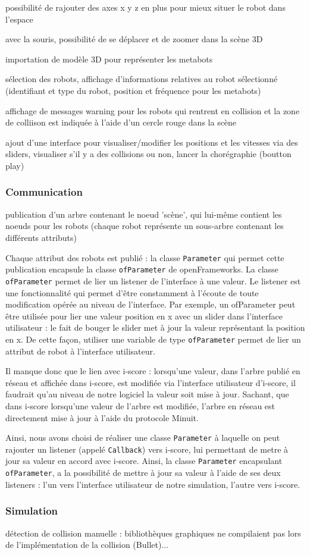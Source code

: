 possibilité de rajouter des axes x y z en plus pour mieux situer le robot dans l'espace

avec la souris, possibilité de se déplacer et de zoomer dans la scène 3D 

importation de modèle 3D pour représenter les metabots

sélection des robots, affichage d'informations relatives au robot sélectionné (identifiant et type du robot, position et fréquence pour les metabots)

affichage de messages warning pour les robots qui rentrent en collision et la zone de colliison est indiquée à l'aide d'un cercle rouge dans la scène

ajout d'une interface pour visualiser/modifier les positions et les vitesses via des sliders, visualiser s'il y a des collisions ou non, lancer la chorégraphie (boutton play)

\subsubsection{Communication}

publication d'un arbre contenant le noeud 'scène', qui lui-même contient les noeuds pour les robots (chaque robot représente un sous-arbre contenant les différents attributs)

Chaque attribut des robots est publié : la classe \verb|Parameter| qui permet cette publication encapsule la classe \verb|ofParameter| de openFrameworks. La classe \verb|ofParameter| permet de lier un listener de l'interface à une valeur. Le listener est une fonctionnalité qui permet d'être constamment à l'écoute de toute modification opérée au niveau de l'interface. Par exemple, un ofParameter peut être utilisée pour lier une valeur position en x avec un slider dans l'interface utilisateur : le fait de bouger le slider met à jour la valeur représentant la position en x. De cette façon, utiliser une variable de type \verb|ofParameter| permet de lier un attribut de robot à l'interface utilisateur. 

Il manque donc que le lien avec i-score : lorsqu'une valeur, dans l'arbre publié en réseau et affichée dans i-score, est modifiée via l'interface utilisateur d'i-score, il faudrait qu'au niveau de notre logiciel la valeur soit mise à jour. Sachant, que dans i-score lorsqu'une valeur de l'arbre est modifiée, l'arbre en réseau est directement mise à jour à l'aide du protocole Minuit.

Ainsi, nous avons choisi de réaliser une classe \verb|Parameter| à laquelle on peut rajouter un listener (appelé \verb|Callback|) vers i-score, lui permettant de metre à jour sa valeur en accord avec i-score. Ainsi, la classe \verb|Parameter| encapsulant \verb|ofParameter|, a la possibilité de mettre à jour sa valeur à l'aide de ses deux listeners : l'un vers l'interface utilisateur de notre simulation, l'autre vers i-score.
     

\subsubsection{Simulation}

détection de collision manuelle : bibliothèques graphiques ne compilaient pas lors de l'implémentation de la collision (Bullet)...

